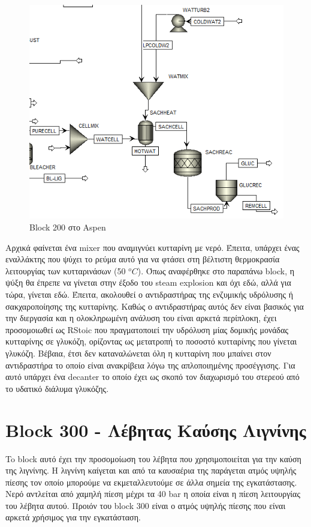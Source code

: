 \documentclass[11pt]{article}
\begin{document}
\begin{figure}[htbp]
\centering
\includegraphics[width=.9\linewidth]{Block_200_-_Παραγωγή_Γλυκόζης/2023-01-10_18-39-54_screenshot.png}
\caption{Block 200 στο Aspen}
\end{figure}


Αρχικά φαίνεται ένα mixer που αναμιγνύει κυτταρίνη με νερό. Έπειτα, υπάρχει ένας εναλλάκτης που ψύχει το ρεύμα αυτό για να φτάσει στη βέλτιστη θερμοκρασία λειτουργίας των κυτταρινάσων (50 \(^oC\)). Όπως αναφέρθηκε στο παραπάνω block, η ψύξη θα έπρεπε να γίνεται στην έξοδο του steam explosion και όχι εδώ, αλλά για τώρα, γίνεται εδώ. Έπειτα, ακολουθεί ο αντιδραστήρας της ενζυμικής υδρόλυσης ή σακχαροποίησης της κυτταρίνης. Καθώς ο αντιδραστήρας αυτός δεν είναι βασικός για την διεργασία και η ολοκληρωμένη ανάλυση του είναι αρκετά περίπλοκη, έχει προσομοιωθεί ως RStoic που πραγματοποιεί την υδρόλυση μίας δομικής μονάδας κυτταρίνης σε γλυκόζη, ορίζοντας ως μετατροπή το ποσοστό κυτταρίνης που γίνεται γλυκόζη. Βέβαια, έτσι δεν καταναλώνεται όλη η κυτταρίνη που μπαίνει στον αντιδραστήρα το οποίο είναι ανακρίβεια λόγω της απλοποιημένης προσέγγισης. Για αυτό υπάρχει ένα decanter το οποίο έχει ως σκοπό τον διαχωρισμό του στερεού από το υδατικό διάλυμα γλυκόζης.

\section{Block 300 - Λέβητας Καύσης Λιγνίνης}
\label{sec:org8160463}
To block αυτό έχει την προσομοίωση του λέβητα που χρησιμοποιείται για την καύση της λιγνίνης. Η λιγνίνη καίγεται και από τα καυσαέρια της παράγεται ατμός υψηλής πίεσης τον οποίο μπορούμε να εκμεταλλευτούμε σε άλλα σημεία της εγκατάστασης. Νερό αντλείται από χαμηλή πίεση μέχρι τα 40 bar η οποία είναι η πίεση λειτουργίας του λέβητα αυτού. Προιόν του block 300 είναι ο ατμός υψηλής πίεσης που είναι αρκετά χρήσιμος για την εγκατάσταση.
\end{document}
